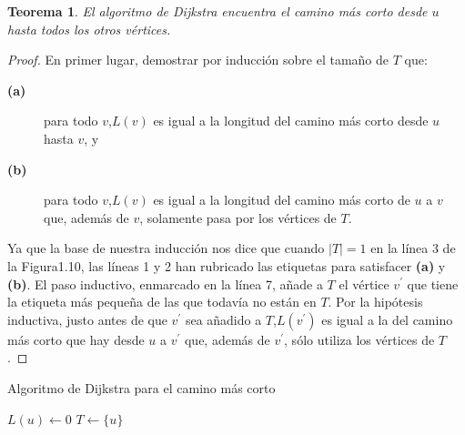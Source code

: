 \documentclass[10pt,a5paper]{book}
\newtheorem{teorema}{Teorema}[chapter]
\begin{document}
\begin{teorema}
  El algoritmo de Dijkstra encuentra el camino más corto desde $u$ hasta todos los otros vértices.
\end{teorema}
\begin{proof}
En primer lugar, demostrar por inducción sobre el tamaño de $T$ que:
\begin{description}
\item[\textbf{(a)}] para todo $v$,$L(v)$ es igual a la longitud del camino más corto desde $u$ hasta $v$, y
\item[\textbf{(b)}] para todo $v$,$L(v)$ es igual a la longitud del camino más corto de $u$ a $v$ que, además de $v$, solamente pasa por los vértices de $T$.
\end{description}
Ya que la base de nuestra inducción nos dice que cuando $|T| = 1$ en la línea 3 de la Figura1.10, las líneas 1 y 2 han rubricado las etiquetas para satisfacer \textbf{(a)} y \textbf{(b)}.
El paso inductivo, enmarcado en la línea 7, añade a $T$ el vértice $v^{'}$ que tiene la etiqueta más pequeña de las que todavía no están en $T$. Por la hipótesis inductiva, justo antes de que $v^{'}$ sea añadido a $T$,$L(v^{'})$ es igual a la del camino más corto que hay desde $u$ a $v^{'}$ que, además de $v^{'}$, sólo utiliza los vértices de $T$.\end{proof}
\vfill
\nopagebreak
\begin{algorithm}[H]
\caption{Algoritmo de Dijkstra para el camino más corto}
\BlankLine
\dontprintsemicolon
{}\;
$L(u) \leftarrow 0$\;
$T \leftarrow \{u\}$\;
{
}
\end{algorithm}
\end{document}
